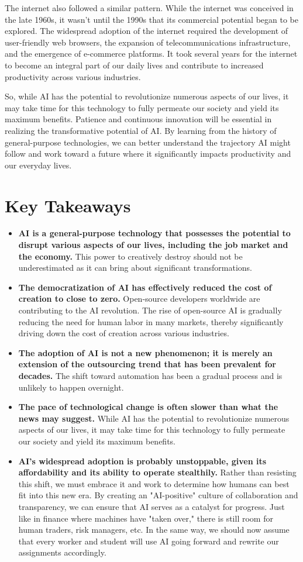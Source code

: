 The internet also followed a similar pattern. While the internet was conceived in the late 1960s, it wasn’t until the 1990s that its commercial potential began to be explored. The widespread adoption of the internet required the development of user-friendly web browsers, the expansion of telecommunications infrastructure, and the emergence of e-commerce platforms. It took several years for the internet to become an integral part of our daily lives and contribute to increased productivity across various industries.

So, while AI has the potential to revolutionize numerous aspects of our lives, it may take time for this technology to fully permeate our society and yield its maximum benefits. Patience and continuous innovation will be essential in realizing the transformative potential of AI. By learning from the history of general-purpose technologies, we can better understand the trajectory AI might follow and work toward a future where it significantly impacts productivity and our everyday lives.

\section{Key Takeaways}

\begin{itemize}
\item \textbf{AI is a general-purpose technology that possesses the potential to disrupt various aspects of our lives, including the job market and the economy.} This power to creatively destroy should not be underestimated as it can bring about significant transformations.
\item \textbf{The democratization of AI has effectively reduced the cost of creation to close to zero.} Open-source developers worldwide are contributing to the AI revolution. The rise of open-source AI is gradually reducing the need for human labor in many markets, thereby significantly driving down the cost of creation across various industries.
\item \textbf{The adoption of AI is not a new phenomenon; it is merely an extension of the outsourcing trend that has been prevalent for decades.} The shift toward automation has been a gradual process and is unlikely to happen overnight.
\item \textbf{The pace of technological change is often slower than what the news may suggest.} While AI has the potential to revolutionize numerous aspects of our lives, it may take time for this technology to fully permeate our society and yield its maximum benefits.
\item \textbf{AI's widespread adoption is probably unstoppable, given its affordability and its ability to operate stealthily.} Rather than resisting this shift, we must embrace it and work to determine how humans can best fit into this new era. By creating an "AI-positive" culture of collaboration and transparency, we can ensure that AI serves as a catalyst for progress. Just like in finance where machines have "taken over," there is still room for human traders, risk managers, etc. In the same way, we should now assume that every worker and student will use AI going forward and rewrite our assignments accordingly.
\end{itemize}
